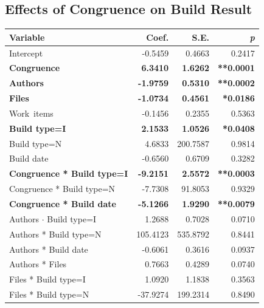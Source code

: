\subsection{Effects of Congruence on Build Result}
\label{sec:congruence_effect_build_result}

\begin{table}[t]
\begin{center}
\small
\begin{tabular}{l@{\hspace{15pt}}rrr}
\toprule
Variable & Coef. & S.E. & \emph{p} \\
	\midrule
Intercept                   &  -0.5459 &   0.4663 & 0.2417 \\
\textbf{Congruence}              &   \textbf{6.3410} &   \textbf{1.6262} & \textbf{**0.0001} \\
\textbf{Authors}                     &  \textbf{-1.9759} &   \textbf{0.5310} & \textbf{**0.0002}  \\
\textbf{Files}                       &  \textbf{-1.0734} &   \textbf{0.4561} & \textbf{*0.0186}  \\
Work~items                   &  -0.1456 &   0.2355 & 0.5363  \\
\textbf{Build type=I}                      &   \textbf{2.1533} &   \textbf{1.0526} & \textbf{*0.0408}  \\
Build type=N                      &   4.6833 & 200.7587 & 0.9814  \\
Build date                   &  -0.6560 &   0.6709 & 0.3282  \\
\textbf{Congruence * Build type=I}     &  \textbf{-9.2151} &   \textbf{2.5572} & \textbf{**0.0003}  \\
Congruence * Build type=N     &  -7.7308 &  91.8053 & 0.9329  \\
\textbf{Congruence * Build date}  &  \textbf{-5.1266} &   \textbf{1.9290} & \textbf{**0.0079}  \\
Authors $\cdot$ Build type=I            &   1.2688 &   0.7028 & 0.0710  \\
Authors * Build type=N            & 105.4123 & 535.8792 & 0.8441  \\
Authors * Build date         &  -0.6061 &   0.3616 & 0.0937 \\
Authors * Files             &   0.7663 &   0.4289 & 0.0740  \\
Files * Build type=I              &   1.0920 &   1.1838 & 0.3563  \\
Files * Build type=N              & -37.9274 & 199.2314 & 0.8490  \\

\end{tabular}
\end{center}
\end{table}
